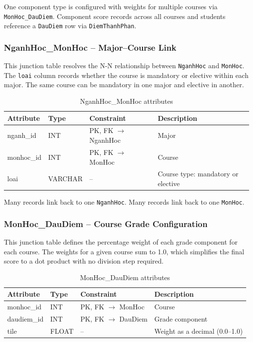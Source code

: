 \documentclass[12pt,a4paper]{report}
\begin{document}
One component type is configured with weights for multiple courses via \texttt{MonHoc\_DauDiem}. Component score records across all courses and students reference a \texttt{DauDiem} row via \texttt{DiemThanhPhan}.

\subsubsection{NganhHoc\_MonHoc -- Major--Course Link}

This junction table resolves the N-N relationship between \texttt{NganhHoc} and \texttt{MonHoc}. The \texttt{loai} column records whether the course is mandatory or elective within each major. The same course can be mandatory in one major and elective in another.

\begin{table}[H]
\renewcommand{\arraystretch}{1.35}
\caption{NganhHoc\_MonHoc attributes}
\label{tab:nganh_monhoc}
\begin{tabular}{|p{3cm}|p{2.5cm}|p{3cm}|p{5cm}|}
  \hline
  \textbf{Attribute} & \textbf{Type} & \textbf{Constraint} & \textbf{Description} \\
  \hline
  nganh\_id & INT & PK, FK $\to$ NganhHoc & Major \\
  \hline
  monhoc\_id & INT & PK, FK $\to$ MonHoc & Course \\
  \hline
  loai & VARCHAR & -- & Course type: mandatory or elective \\
  \hline
\end{tabular}
\end{table}

Many records link back to one \texttt{NganhHoc}. Many records link back to one \texttt{MonHoc}.

\subsubsection{MonHoc\_DauDiem -- Course Grade Configuration}

This junction table defines the percentage weight of each grade component for each course. The weights for a given course sum to 1.0, which simplifies the final score to a dot product with no division step required.

\begin{table}[H]
\renewcommand{\arraystretch}{1.35}
\caption{MonHoc\_DauDiem attributes}
\label{tab:monhoc_daudiem}
\begin{tabular}{|p{3cm}|p{2.5cm}|p{3cm}|p{5cm}|}
  \hline
  \textbf{Attribute} & \textbf{Type} & \textbf{Constraint} & \textbf{Description} \\
  \hline
  monhoc\_id & INT & PK, FK $\to$ MonHoc & Course \\
  \hline
  daudiem\_id & INT & PK, FK $\to$ DauDiem & Grade component \\
  \hline
  tile & FLOAT & -- & Weight as a decimal (0.0--1.0) \\
  \hline
\end{tabular}
\end{table}
\end{document}
